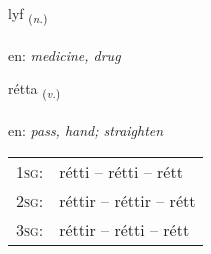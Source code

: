 \documentclass[frontgrid, backgrid]{flacards}\usepackage[]{graphicx}\usepackage[]{color}
\begin{document}
\renewcommand{\flhead}{\vskip5pt \fboxsep=0pt {\small\bfseries\footnotesize Nafnorð | Noun}}
\renewcommand{\fcfoot}{\vskip5pt \fboxsep=0pt \hspace{2pt}{\small\bfseries\footnotesize 2K}}

\renewcommand{\blhead}{\vskip5pt {\small\bfseries\footnotesize Nafnorð | Noun }}
\renewcommand{\bcfoot}{\vskip5pt \hspace{2pt}{\small\bfseries\footnotesize 2K}}


{lyf \small{\textsubscript{(\textit{n.})}} \\[1ex] %
\textphonetic{[lɪːv]} \\
en: \emph{medicine, drug} \\  [2ex]
\renewcommand*{\arraystretch}{0.8}
}

\renewcommand{\flhead}{\vskip5pt \fboxsep=0pt {\small\bfseries\footnotesize Sagnorð | Verb}}
\renewcommand{\fcfoot}{\vskip5pt \fboxsep=0pt \hspace{2pt}{\small\bfseries\footnotesize 2K}}

\renewcommand{\blhead}{\vskip5pt {\small\bfseries\footnotesize Sagnorð | Verb }}
\renewcommand{\bcfoot}{\vskip5pt \hspace{2pt}{\small\bfseries\footnotesize 2K}}


{rétta \small{\textsubscript{(\textit{v.})}} \\[1ex] %
\textphonetic{[rjɛhta]} \\
en: \emph{pass, hand; straighten} \\  [2ex]
\renewcommand*{\arraystretch}{0.8}
\begin{tabular}{p{1cm}l}
\textsc{1sg}: & rétti -- rétti -- rétt \\ 
\textsc{2sg}: & réttir -- réttir -- rétt \\ 
\textsc{3sg}: & réttir -- rétti -- rétt \\ 
\end{tabular}
}
\end{document}
